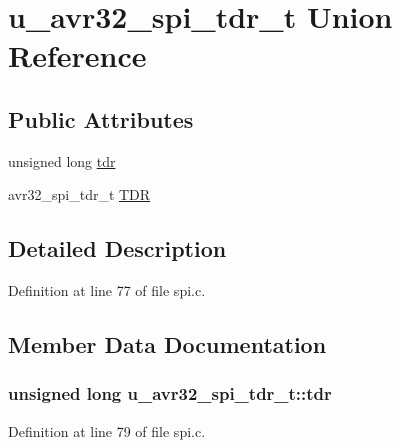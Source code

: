 \hypertarget{unionu__avr32__spi__tdr__t}{}\section{u\+\_\+avr32\+\_\+spi\+\_\+tdr\+\_\+t Union Reference}
\label{unionu__avr32__spi__tdr__t}
\subsection*{Public Attributes}
\begin{DoxyCompactItemize}
\item 
unsigned long \hyperlink{unionu__avr32__spi__tdr__t_a778b01c8c5c2e0fb1ad5b062b15c270c}{tdr}
\item 
avr32\+\_\+spi\+\_\+tdr\+\_\+t \hyperlink{unionu__avr32__spi__tdr__t_a425da47da39981295bab04c5b8b0d344}{T\+D\+R}
\end{DoxyCompactItemize}


\subsection{Detailed Description}


Definition at line 77 of file spi.\+c.



\subsection{Member Data Documentation}
\hypertarget{unionu__avr32__spi__tdr__t_a778b01c8c5c2e0fb1ad5b062b15c270c}{}
\subsubsection[{tdr}]{\setlength{\rightskip}{0pt plus 5cm}unsigned long u\+\_\+avr32\+\_\+spi\+\_\+tdr\+\_\+t\+::tdr}\label{unionu__avr32__spi__tdr__t_a778b01c8c5c2e0fb1ad5b062b15c270c}


Definition at line 79 of file spi.\+c.

\hypertarget{unionu__avr32__spi__tdr__t_a425da47da39981295bab04c5b8b0d344}{}
